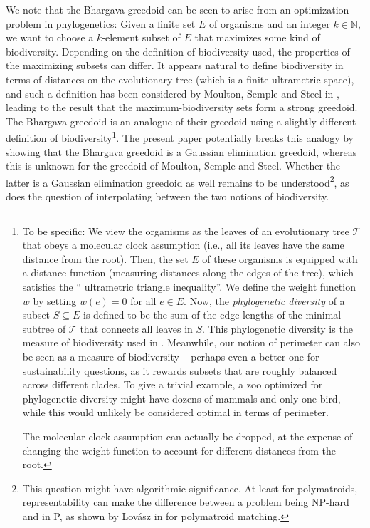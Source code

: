 \documentclass[numbers=enddot,12pt,final,onecolumn,notitlepage]{scrartcl}%
\theoremstyle{definition}
\theoremstyle{plainsl}
\begin{document}
We note that the Bhargava greedoid can be seen to arise from an optimization
problem in phylogenetics: Given a finite set $E$ of organisms and an integer
$k\in\mathbb{N}$, we want to choose a $k$-element subset of $E$ that maximizes
some kind of biodiversity. Depending on the definition of biodiversity used,
the properties of the maximizing subsets can differ. It appears natural to
define biodiversity in terms of distances on the evolutionary tree (which is a
finite ultrametric space), and such a definition has been considered by
Moulton, Semple and Steel in \cite{MoSeSt06}, leading to the result that the
maximum-biodiversity sets form a strong greedoid. The Bhargava greedoid is an
analogue of their greedoid using a slightly different definition of
biodiversity\footnote{To be specific: We view the organisms as the leaves of
an evolutionary tree $\mathcal{T}$ that obeys a molecular clock assumption
(i.e., all its leaves have the same distance from the root). Then, the set $E$
of these organisms is equipped with a distance function (measuring distances
along the edges of the tree), which satisfies the \textquotedblleft
ultrametric triangle inequality\textquotedblright. We define the weight
function $w$ by setting $w\left(  e\right)  =0$ for all $e\in E$. Now, the
\emph{phylogenetic diversity} of a subset $S\subseteq E$ is defined to be the
sum of the edge lengths of the minimal subtree of $\mathcal{T}$ that connects
all leaves in $S$. This phylogenetic diversity is the measure of biodiversity
used in \cite{MoSeSt06}. Meanwhile, our notion of perimeter can also be seen
as a measure of biodiversity -- perhaps even a better one for sustainability
questions, as it rewards subsets that are roughly balanced across different
clades. To give a trivial example, a zoo optimized for phylogenetic diversity
might have dozens of mammals and only one bird, while this would unlikely be
considered optimal in terms of perimeter.
\par
The molecular clock assumption can actually be dropped, at the expense of
changing the weight function to account for different distances from the
root.}. The present paper potentially breaks this analogy by showing that the
Bhargava greedoid is a Gaussian elimination greedoid, whereas this is unknown
for the greedoid of Moulton, Semple and Steel. Whether the latter is a
Gaussian elimination greedoid as well remains to be understood\footnote{This
question might have algorithmic significance. At least for polymatroids,
representability can make the difference between a problem being NP-hard and
in P, as shown by Lov\'{a}sz in \cite{Lovasz80} for polymatroid matching.}, as
does the question of interpolating between the two notions of biodiversity.
\end{document}
